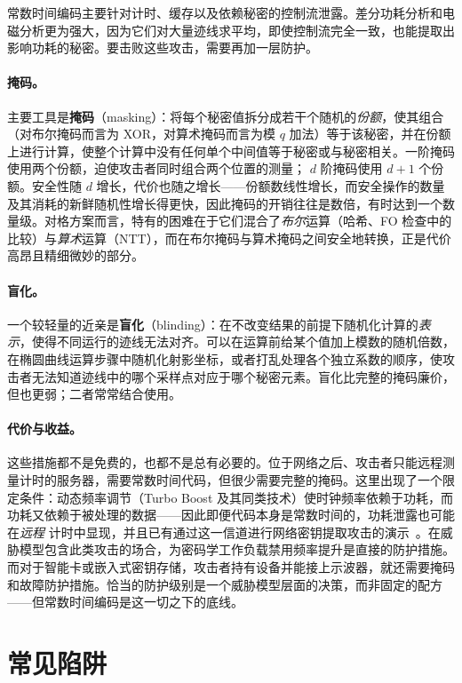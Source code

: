 常数时间编码主要针对计时、缓存以及依赖秘密的控制流泄露。差分功耗分析和电磁分析更为强大，因为它们对大量迹线求平均，即使控制流完全一致，也能提取出影响功耗的秘密。要击败这些攻击，需要再加一层防护。

\paragraph{掩码。}
主要工具是\textbf{掩码}（masking）：将每个秘密值拆分成若干个随机的\emph{份额}，使其组合（对布尔掩码而言为 XOR，对算术掩码而言为模 $q$ 加法）等于该秘密，并在份额上进行计算，使整个计算中没有任何单个中间值等于秘密或与秘密相关。一阶掩码使用两个份额，迫使攻击者同时组合两个位置的测量；
$d$ 阶掩码使用 $d+1$ 个份额。安全性随 $d$ 增长，代价也随之增长——份额数线性增长，而安全操作的数量及其消耗的新鲜随机性增长得更快，因此掩码的开销往往是数倍，有时达到一个数量级。对格方案而言，特有的困难在于它们混合了\emph{布尔}运算（哈希、FO 检查中的比较）与\emph{算术}运算（NTT），而在布尔掩码与算术掩码之间安全地转换，正是代价高昂且精细微妙的部分。

\paragraph{盲化。}
一个较轻量的近亲是\textbf{盲化}（blinding）：在不改变结果的前提下随机化计算的\emph{表示}，使得不同运行的迹线无法对齐。可以在运算前给某个值加上模数的随机倍数，在椭圆曲线运算步骤中随机化射影坐标，或者打乱处理各个独立系数的顺序，使攻击者无法知道迹线中的哪个采样点对应于哪个秘密元素。盲化比完整的掩码廉价，但也更弱；二者常常结合使用。

\paragraph{代价与收益。}
这些措施都不是免费的，也都不是总有必要的。位于网络之后、攻击者只能远程测量计时的服务器，需要常数时间代码，但很少需要完整的掩码。这里出现了一个限定条件：动态频率调节（Turbo Boost 及其同类技术）使时钟频率依赖于功耗，而功耗又依赖于被处理的数据——因此即便代码本身是常数时间的，功耗泄露也可能在\emph{远程}
计时中显现，并且已有通过这一信道进行网络密钥提取攻击的演示~\cite{hertzbleed2022}。在威胁模型包含此类攻击的场合，为密码学工作负载禁用频率提升是直接的防护措施。而对于智能卡或嵌入式密钥存储，攻击者持有设备并能接上示波器，就还需要掩码和故障防护措施。恰当的防护级别是一个威胁模型层面的决策，而非固定的配方——但常数时间编码是这一切之下的底线。

\section{常见陷阱}

